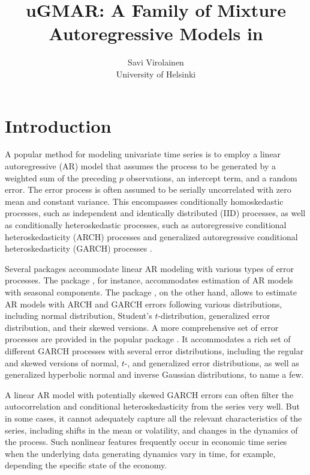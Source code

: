 \documentclass[nojss]{jss} %
\author{Savi Virolainen\\ University of Helsinki}
\title{uGMAR: A Family of Mixture Autoregressive Models in \proglang{R}}
\begin{document}
\section{Introduction}
A popular method for modeling univariate time series is to employ a linear autoregressive (AR) model that assumes the process to be generated by a weighted sum of the preceding $p$ observations, an intercept term, and a random error. The error process is often assumed to be serially uncorrelated with zero mean and constant variance. This encompasses conditionally homoskedastic processes, such as independent and identically distributed (IID) processes, as well as conditionally heteroskedastic processes, such as autoregressive conditional heteroskedasticity (ARCH) processes \citep{Engle:1982} and generalized autoregressive conditional heteroskedasticity (GARCH) processes \citep{Bollerslev:1986}.

Several  packages accommodate linear AR modeling with various types of error processes. The  package  \citep{Hyndman+Athanasopoulos+Bergmeir+Caceres+Chhay+O'Hara-Wild+Petropoulos+Razbash+Wang+Yasmeen:2021}, for instance, accommodates estimation of AR models with seasonal components. The  package  \citep{Wuertz+Chalabi+Boudt+Chausse+Miklovac:2020}, on the other hand, allows to estimate AR models with ARCH and GARCH errors following various distributions, including normal distribution, Student's $t$-distribution, generalized error distribution, and their skewed versions. A more comprehensive set of error processes are provided in the popular  package  \citep{Ghalanos:2020}. It accommodates a rich set of different GARCH processes with several error distributions, including the regular and skewed versions of normal, $t$-, and generalized error distributions, as well as generalized hyperbolic normal and inverse Gaussian distributions, to name a few.

A linear AR model with potentially skewed GARCH errors can often filter the autocorrelation and conditional heteroskedasticity from the series very well. But in some cases, it cannot adequately capture all the relevant characteristics of the series, including
shifts in the mean or volatility, and changes in the dynamics of the process. Such nonlinear features frequently occur in economic time series when the underlying data generating dynamics vary in time, for example, depending the specific state of the economy.
\end{document}

